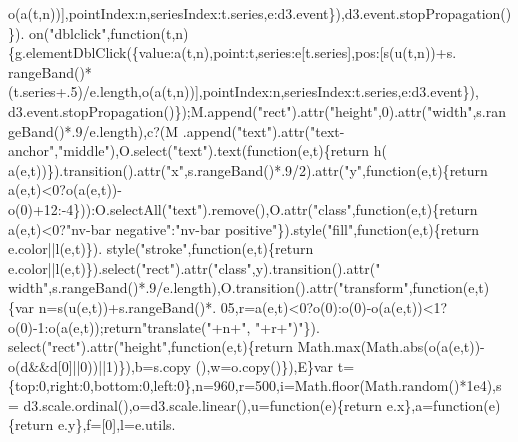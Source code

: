 \begin{DoxyCode}
      o(a(t,n))],pointIndex:n,seriesIndex:t.series,e:d3.event\}),d3.event.stopPropagation()\}).
      on(\textcolor{stringliteral}{"dblclick"},\textcolor{keyword}{function}(t,n)\{g.elementDblClick(\{value:a(t,n),point:t,series:e[t.series],pos:[s(u(t,n))+s.
      rangeBand()*(t.series+.5)/e.length,o(a(t,n))],pointIndex:n,seriesIndex:t.series,e:d3.event\}),
      d3.event.stopPropagation()\});M.append(\textcolor{stringliteral}{"rect"}).attr(\textcolor{stringliteral}{"height"},0).attr(\textcolor{stringliteral}{"width"},s.rangeBand()*.9/e.length),c?(M
      .append(\textcolor{stringliteral}{"text"}).attr(\textcolor{stringliteral}{"text-anchor"},\textcolor{stringliteral}{"middle"}),O.select(\textcolor{stringliteral}{"text"}).text(\textcolor{keyword}{function}(e,t)\{\textcolor{keywordflow}{return} h(
      a(e,t))\}).transition().attr(\textcolor{stringliteral}{"x"},s.rangeBand()*.9/2).attr(\textcolor{stringliteral}{"y"},\textcolor{keyword}{function}(e,t)\{\textcolor{keywordflow}{return} 
      a(e,t)<0?o(a(e,t))-o(0)+12:-4\})):O.selectAll(\textcolor{stringliteral}{"text"}).remove(),O.attr(\textcolor{stringliteral}{"class"},\textcolor{keyword}{function}(e,t)\{\textcolor{keywordflow}{return} 
      a(e,t)<0?\textcolor{stringliteral}{"nv-bar negative"}:\textcolor{stringliteral}{"nv-bar positive"}\}).style(\textcolor{stringliteral}{"fill"},\textcolor{keyword}{function}(e,t)\{\textcolor{keywordflow}{return} e.color||l(e,t)\}).
      style(\textcolor{stringliteral}{"stroke"},\textcolor{keyword}{function}(e,t)\{\textcolor{keywordflow}{return} e.color||l(e,t)\}).select(\textcolor{stringliteral}{"rect"}).attr(\textcolor{stringliteral}{"class"},y).transition().attr(\textcolor{stringliteral}{"
      width"},s.rangeBand()*.9/e.length),O.transition().attr(\textcolor{stringliteral}{"transform"},\textcolor{keyword}{function}(e,t)\{var n=s(u(e,t))+s.rangeBand()*.
      05,r=a(e,t)<0?o(0):o(0)-o(a(e,t))<1?o(0)-1:o(a(e,t));\textcolor{keywordflow}{return}\textcolor{stringliteral}{"translate("}+n+\textcolor{stringliteral}{", "}+r+\textcolor{stringliteral}{")"}\}).
      select(\textcolor{stringliteral}{"rect"}).attr(\textcolor{stringliteral}{"height"},\textcolor{keyword}{function}(e,t)\{\textcolor{keywordflow}{return} Math.max(Math.abs(o(a(e,t))-o(d&&d[0]||0))||1)\}),b=s.copy
      (),w=o.copy()\}),E\}var t=\{top:0,right:0,bottom:0,left:0\},n=960,r=500,i=Math.floor(Math.random()*1e4),s=
      d3.scale.ordinal(),o=d3.scale.linear(),u=\textcolor{keyword}{function}(e)\{\textcolor{keywordflow}{return} e.x\},a=\textcolor{keyword}{function}(e)\{\textcolor{keywordflow}{return} e.y\},f=[0],l=e.utils.

\end{DoxyCode}
